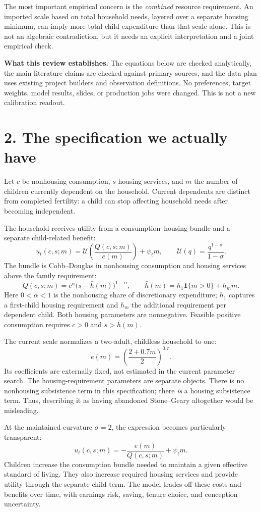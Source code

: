 \documentclass[11pt,letterpaper]{article}
\newcommand{\U}{\mathcal U}
\newcommand{\hh}{\bar h}
\newcommand{\page}[1]{\newpage\section*{#1}}
\begin{document}
The most important empirical concern is the \emph{combined} resource requirement. An imported scale based on total household needs, layered over a separate housing minimum, can imply more total child expenditure than that scale alone. This is not an algebraic contradiction, but it needs an explicit interpretation and a joint empirical check.

\textbf{What this review establishes.} The equations below are checked analytically, the main literature claims are checked against primary sources, and the data plan uses existing project builders and observation definitions. No preferences, target weights, model results, slides, or production jobs were changed. This is not a new calibration readout.

\page{2. The specification we actually have}
Let $c$ be nonhousing consumption, $s$ housing services, and $m$ the number of children currently dependent on the household. Current dependents are distinct from completed fertility: a child can stop affecting household needs after becoming independent.

The household receives utility from a consumption--housing bundle and a separate child-related benefit:
\[
u_t(c,s;m)=\U\!\left(\frac{Q(c,s;m)}{e(m)}\right)+\psi_t m,
\qquad
\U(q)=\frac{q^{1-\sigma}}{1-\sigma}.
\]
The bundle is Cobb--Douglas in nonhousing consumption and housing services above the family requirement:
\[
Q(c,s;m)=c^{\alpha}\bigl(s-\hh(m)\bigr)^{1-\alpha},
\qquad
\hh(m)=h_1\mathbf 1\{m>0\}+h_m m.
\]
Here $0<\alpha<1$ is the nonhousing share of discretionary expenditure; $h_1$ captures a first-child housing requirement and $h_m$ the additional requirement per dependent child. Both housing parameters are nonnegative. Feasible positive consumption requires $c>0$ and $s>\hh(m)$.

The current scale normalizes a two-adult, childless household to one:
\[
e(m)=\left(\frac{2+0.7m}{2}\right)^{0.7}.
\]
Its coefficients are externally fixed, not estimated in the current parameter search. The housing-requirement parameters are separate objects. There is no nonhousing subsistence term in this specification; there \emph{is} a housing subsistence term. Thus, describing it as having abandoned Stone--Geary altogether would be misleading.

At the maintained curvature $\sigma=2$, the expression becomes particularly transparent:
\[
\boxed{\quad u_t(c,s;m)=-\frac{e(m)}{Q(c,s;m)}+\psi_t m.\quad}
\]
Children increase the consumption bundle needed to maintain a given effective standard of living. They also increase required housing services and provide utility through the separate child term. The model trades off these costs and benefits over time, with earnings risk, saving, tenure choice, and conception uncertainty.
\end{document}
